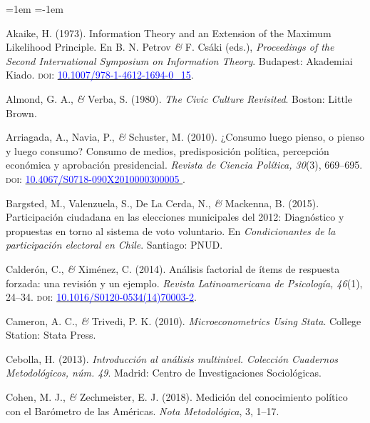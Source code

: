 \documentclass[a4paper]{tufte-handout}
\begin{document}
\begin{list}{}%
{\leftmargin=1em \itemindent=-1em}

\item{\small Akaike, H. (1973). Information Theory and an Extension of the Maximum Likelihood Principle. En B. N. Petrov {\itshape \&} F. Csáki (eds.), {\itshape Proceedings of the Second International Symposium on Information Theory}. Budapest: Akademiai Kiado. {\scshape doi:} \href{https://doi.org/10.1007/978-1-4612-1694-0\_15}{\textcolor{blue}{10.1007/978-1-4612-1694-0\_15}}.}

\item{\small Almond, G. A., {\itshape \&} Verba, S. (1980). {\itshape The Civic Culture Revisited}. Boston: Little Brown.}

\item{\small Arriagada, A., Navia, P., {\itshape \&} Schuster, M. (2010). ¿Consumo luego pienso, o pienso y luego consumo? Consumo de medios, predisposición política, percepción económica y aprobación presidencial. {\itshape Revista de Ciencia Política, 30}(3), 669--695. {\scshape doi:} \href{http://dx.doi.org/10.4067/S0718-090X2010000300005 }{\textcolor{blue}{10.4067/S0718-090X2010000300005 }}.}

\item{\small Bargsted, M., Valenzuela, S., De La Cerda, N., {\itshape \&} Mackenna, B. (2015). Participación ciudadana en las elecciones municipales del 2012: Diagnóstico y propuestas en torno al sistema de voto voluntario. En {\itshape Condicionantes de la participación electoral en Chile}. Santiago: PNUD.}

\item{\small Calderón, C., {\itshape \&} Ximénez, C. (2014). Análisis factorial de ítems de respuesta forzada: una revisión y un ejemplo. {\itshape Revista Latinoamericana de Psicología, 46}(1), 24--34. {\scshape doi:} \href{https://doi.org/10.1016/S0120-0534(14)70003-2}{\textcolor{blue}{10.1016/S0120-0534(14)70003-2}}.}

\item{\small Cameron, A. C., {\itshape \&} Trivedi, P. K. (2010). {\itshape Microeconometrics Using Stata}. College Station: Stata Press.}

\item{\small Cebolla, H. (2013). {\itshape Introducción al análisis multinivel. Colección Cuadernos Metodológicos, núm. 49}. Madrid: Centro de Investigaciones Sociológicas.}

\item{\small Cohen, M. J., {\itshape \&} Zechmeister, E. J. (2018). Medición del conocimiento político con el Barómetro de las Américas. {\itshape Nota Metodológica}, 3, 1--17.}


\end{list}
\end{document}

